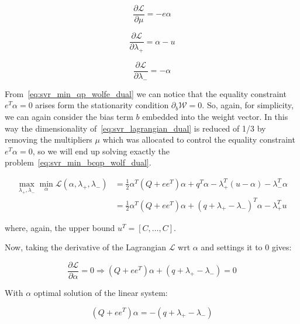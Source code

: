 \begin{equation} \label{eq:svr_lagrangian_der_mu}
	\frac{\partial \mathcal{L}}{\partial \mu}=-e \alpha
\end{equation}

\begin{equation} \label{eq:svr_lagrangian_der_lp}
	\frac{\partial \mathcal{L}}{\partial \lambda_+}=\alpha - u
\end{equation}

\begin{equation} \label{eq:svr_lagrangian_der_lm}
    \frac{\partial \mathcal{L}}{\partial \lambda_-}=-\alpha
\end{equation}

From~\eqref{eq:svr_min_qp_wolfe_dual} we can notice that the equality constraint $e^T \alpha = 0$ arises form the stationarity condition $\partial_{{b}} \mathcal{W}=0$. So, again, for simplicity, we can again consider the bias term $b$ embedded into the weight vector. In this way the dimensionality of~\eqref{eq:svr_lagrangian_dual} is reduced of 1/3 by removing the multipliers $\mu$ which was allocated to control the equality constraint $e^T \alpha=0$, so we will end up solving exactly the problem~\eqref{eq:svr_min_bcqp_wolf_dual}.

\begin{equation} \label{eq:svr_bcqp_lagrangian_dual}
	\begin{aligned}
    	\max_{\lambda_+,\lambda_-} \min_{\alpha} \mathcal{L}(\alpha,\lambda_+,\lambda_-) &= \frac{1}{2} \alpha^T (Q + ee^T)\alpha+q^T\alpha - \lambda_+^T (u - \alpha) - \lambda_-^T \alpha \\
    &= \frac{1}{2} \alpha^T (Q + ee^T)\alpha + (q + \lambda_+ - \lambda_-)^T \alpha - \lambda_+^T u
	\end{aligned}
\end{equation}

where, again, the upper bound $u^T = [C, \dots, C]$.

Now, taking the derivative of the Lagrangian $\mathcal{L}$ wrt $\alpha$ and settings it to 0 gives:

\begin{equation} \label{eq:svr_bcqp_lagrangian_der_a}
	\frac{\partial \mathcal{L}}{\partial \alpha}=0\Rightarrow (Q + ee^T) \alpha + (q + \lambda_+ - \lambda_-) = 0
\end{equation}

With $\alpha$ optimal solution of the linear system:

\begin{equation} \label{eq:svr_bcqp_lagrangian_sol}
    (Q + ee^T) \alpha = - (q + \lambda_+ - \lambda_-)
\end{equation}

